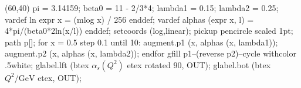 \documentclass{article}
\begin{document}
\begin{empgraph}(60,40)
 pi = 3.14159; beta0 = 11 - 2/3*4;
 lambda1 = 0.15; lambda2 = 0.25;
 vardef ln expr x = (mlog x) / 256 enddef;
 vardef alphas (expr x, l) = 4*pi/(beta0*2ln(x/l)) enddef;
 setcoords (log,linear);
 pickup pencircle scaled 1pt;
 path p[];
 for x = 0.5 step 0.1 until 10:
 augment.p1 (x, alphas (x, lambda1));
 augment.p2 (x, alphas (x, lambda2));
 endfor
 gfill p1--(reverse p2)--cycle withcolor .5white;
 glabel.lft (btex $\alpha_s(Q^2)$ etex rotated 90, OUT);
 glabel.bot (btex $Q^2/\text{GeV}$ etex, OUT);
\end{empgraph}
\end{document}
